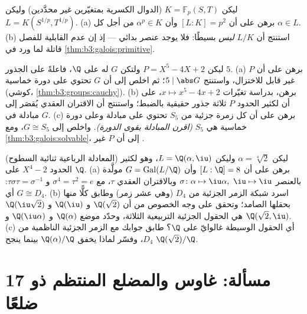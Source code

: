 \begin{exercise}[$\star\star\star$]\label{exo:b3:galois:10}
ليكن $K = \mathbb F_p(S, T)$ (الدوال الكسرية بمتغيّرين غير محدَّدين) وليكن
$L = K(S^{1/p}, T^{1/p})$.
(a) برهن على أن $[L:K] = p^2$ وأن $\alpha^p \in K$ من أجل كل
$\alpha \in L$.
(b) استنتج أن $L/K$ \emph{ليس} بسيطًا: فلا يوجد عنصر بدائي ---
إذ إن عدم القابلية للفصل قاتلة لما ورد في \cref{thm:b3:galois:primitive}.
\end{exercise}

\begin{exercise}[$\star\star\star$]\label{exo:b3:galois:11}
ليكن $P = X^5 - 4X + 2$ ولتكن $G$  له على $\Q$، فاعلةً على
الجذور $5$.
(a) برهن على أن $P$ غير قابل للاختزال، واستنتج $5 \mid \abs G$؛
ثم اخلص إلى أن $G$ تحتوي على دورة خماسية (كوشي، \cref{thm:b3:groups:cauchy}).
(b) برهن، بدراسة تغيّرات $x \mapsto x^5 - 4x +
2$، على أن لكثير الحدود $P$ ثلاثة جذور
حقيقية بالضبط؛ واستنتج أن الاقتران العقدي يُقصَر إلى مبادلة في
$G$.
(c) برهن على أن كل زمرة جزئية من $S_5$ تحتوي على مبادلة وعلى
دورة خماسية هي $S_5$ \emph{(اقرن المبادلة بقوى الدورة)}. واخلص
إلى $G \cong S_5$، ومع \cref{thm:b3:galois:solvable}، إلى أن $P$ غير .
\end{exercise}

\begin{exercise}[$\star\star\star$]\label{exo:b3:galois:12}
(المعادلة الرباعية ثنائية السطوح) ليكن $\alpha = \sqrt[4]2$ وليكن $L =
\Q(\alpha, \iu)$،
وهو  لكثير الحدود $X^4 - 2$ على $\Q$.
(a) برهن على أن $[L : \Q] = 8$ وأن $G =
\operatorname{Gal}(L/\Q)$ مولَّدة بالعنصر $\sigma\colon
\alpha \mapsto \iu\alpha,\ \iu \mapsto \iu$
وبالاقتران العقدي $\tau$، مع $\sigma^4 = \tau^2 = e$ و $\tau\sigma\tau = \sigma^{-1}$: أي
$G \cong D_4$.
(b) اسرد شبكة الزمر الجزئية من $D_4$ (وهي عشر زمر) وطابق كلًّا
منها بحقلها الصامد؛ وتحقق على وجه الخصوص من أن $\Q(\sqrt2)$
و $\Q(\iu)$ و $\Q(\iu\sqrt2)$ هي الحقول الجزئية التربيعية
الثلاثة، وحدّد موضع $\Q(\alpha)$ و $\Q(\iu\alpha)$ و $\Q(\sqrt2, \iu)$.
(c) أي الحقول الوسيطة غالوايّ على $\Q$؟ طابق جوابك مع الزمر
الجزئية الناظمية من $D_4$، وفسّر لماذا يخفق $\Q(\alpha)/\Q$
بينما ينجح $\Q(\sqrt2)/\Q$.
\end{exercise}

\section{مسألة: غاوس والمضلع المنتظم ذو 17 ضلعًا}

